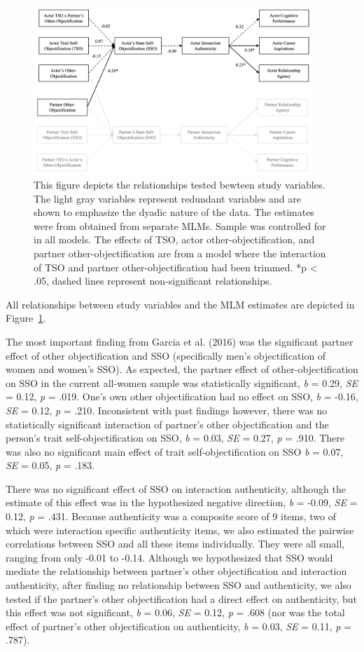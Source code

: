 \documentclass[man]{apa6}
\begin{document}
\begin{figure}
\includegraphics[width=400px]{SEMfigure} \caption{This figure depicts the relationships tested bewteen study variables. The light gray variables represent redundant variables and are shown to emphasize the dyadic nature of the data. The estimates were from obtained from separate MLMs. Sample was controlled for in all models. The effects of TSO, actor other-objectification, and partner other-objectification are from a model where the interaction of TSO and partner other-objectification had been trimmed. *p < .05, dashed lines represent non-significant relationships.}\label{fig:semfigure}
\end{figure}

All relationships between study variables and the MLM estimates are
depicted in Figure~\ref{fig:semfigure}.

The most important finding from Garcia et al. (2016) was the significant
partner effect of other objectification and SSO (specifically men's
objectification of women and women's SSO). As expected, the partner
effect of other-objectification on SSO in the current all-women sample
was statistically significant, \emph{b} = 0.29, \emph{SE} = 0.12,
\emph{p} = .019. One's own other objectification had no effect on SSO,
\emph{b} = -0.16, \emph{SE} = 0.12, \emph{p} = .210. Inconsistent with
past findings however, there was no statistically significant
interaction of partner's other objectification and the person's trait
self-objectification on SSO, \emph{b} = 0.03, \emph{SE} = 0.27, \emph{p}
= .910. There was also no significant main effect of trait
self-objectification on SSO \emph{b} = 0.07, \emph{SE} = 0.05, \emph{p}
= .183.

There was no significant effect of SSO on interaction authenticity,
although the estimate of this effect was in the hypothesized negative
direction, \emph{b} = -0.09, \emph{SE} = 0.12, \emph{p} = .431. Because
authenticity was a composite score of 9 items, two of which were
interaction specific authenticity items, we also estimated the pairwise
correlations between SSO and all these items individually. They were all
small, ranging from only -0.01 to -0.14. Although we hypothesized that
SSO would mediate the relationship between partner's other
objectification and interaction authenticity, after finding no
relationship between SSO and authenticity, we also tested if the
partner's other objectification had a direct effect on authenticity, but
this effect was not significant, \emph{b} = 0.06, \emph{SE} = 0.12,
\emph{p} = .608 (nor was the total effect of partner's other
objectification on authenticity, \emph{b} = 0.03, \emph{SE} = 0.11,
\emph{p} = .787).
\end{document}

